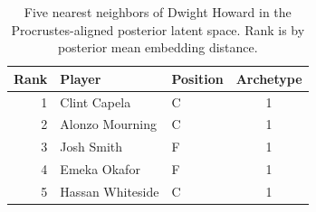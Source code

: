 \begin{table}[htbp]
  \centering\small
  \begin{tabular}{rllc}
    \toprule
    Rank & Player & Position & Archetype \\
    \midrule
    1 & Clint Capela & C & 1 \\
    2 & Alonzo Mourning & C & 1 \\
    3 & Josh Smith & F & 1 \\
    4 & Emeka Okafor & F & 1 \\
    5 & Hassan Whiteside & C & 1 \\
    \bottomrule
  \end{tabular}
  \caption{Five nearest neighbors of Dwight Howard in the Procrustes-aligned posterior latent space. Rank is by posterior mean embedding distance.}
  \label{tab:Dwight_Howard_neighbors}
\end{table}

